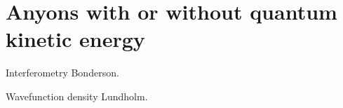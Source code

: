 \documentclass[a4paper,10pt,oneside]{book}
\theoremstyle{plain}
\theoremstyle{definition}
\theoremstyle{remark}
\begin{document}
\section{Anyons with or without quantum kinetic energy}

Interferometry Bonderson.

Wavefunction density Lundholm.









\end{document}
